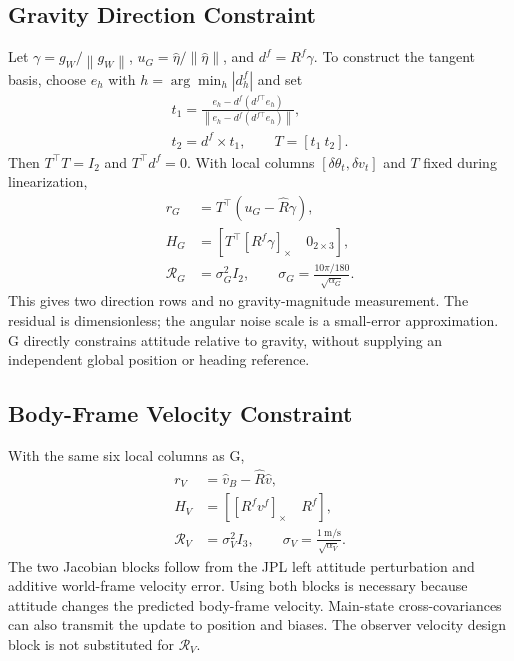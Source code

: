 \documentclass[a4paper,runningheads,twocolumn]{llncs}
\newcommand{\sk}[1]{[#1]_{\times}}
\newcommand{\norm}[1]{\left\lVert #1\right\rVert}
\begin{document}
\subsection{Gravity Direction Constraint}
Let $\gamma=g_W/\norm{g_W}$, $u_G=\hat\eta/\norm{\hat\eta}$, and $d^f=R^f\gamma$. To construct the tangent basis, choose $e_h$ with $h=\arg\min_h|d_h^f|$ and set
\begin{equation}
 \begin{gathered}
 t_1=\frac{e_h-d^f(d^{f\top}e_h)}{\norm{e_h-d^f(d^{f\top}e_h)}},\\
 t_2=d^f\times t_1,\qquad T=[t_1\ t_2].
 \end{gathered}
 \label{eq:gravitybasis}
\end{equation}
Then $T^\top T=I_2$ and $T^\top d^f=0$. With local columns $[\delta\theta_t,\delta v_t]$ and $T$ fixed during linearization,
\begin{equation}
 \begin{aligned}
 r_G&=T^\top(u_G-\hat R\gamma),\\
 H_G&=[T^\top\sk{R^f\gamma}\quad0_{2\times3}],\\
 \mathcal R_G&=\sigma_G^2I_2,\qquad
 \sigma_G=\frac{10\pi/180}{\sqrt{\alpha_G}}.
 \end{aligned}
 \label{eq:gravity}
\end{equation}
This gives two direction rows and no gravity-magnitude measurement. The residual is dimensionless; the angular noise scale is a small-error approximation. G directly constrains attitude relative to gravity, without supplying an independent global position or heading reference.

\subsection{Body-Frame Velocity Constraint}
With the same six local columns as G,
\begin{equation}
 \begin{aligned}
 r_V&=\hat v_B-\hat R\hat v,\\
 H_V&=[\sk{R^fv^f}\quad R^f],\\
 \mathcal R_V&=\sigma_V^2I_3,\qquad
 \sigma_V=\frac{1~\mathrm{m/s}}{\sqrt{\alpha_V}}.
 \end{aligned}
 \label{eq:velocity}
\end{equation}
The two Jacobian blocks follow from the JPL left attitude perturbation and additive world-frame velocity error. Using both blocks is necessary because attitude changes the predicted body-frame velocity. Main-state cross-covariances can also transmit the update to position and biases. The observer velocity design block is not substituted for $\mathcal R_V$.
\end{document}
